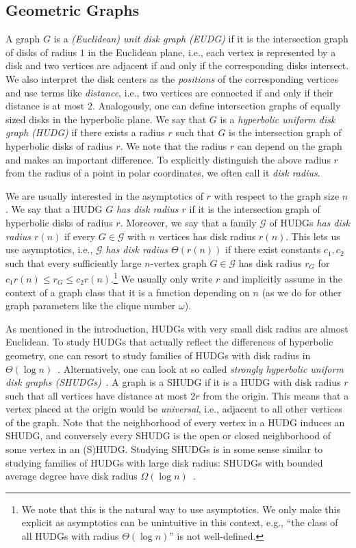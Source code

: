 \documentclass[a4paper,english,cleveref,thm-restate]{lipics-v2021}
\newcommand{\calG}{\ensuremath{\mathcal{G}}\xspace}
\begin{document}
\subsection{Geometric Graphs}

A graph $G$ is a \emph{(Euclidean) unit disk graph (EUDG)} if it is the intersection graph of disks of radius $1$ in the Euclidean plane, i.e., each vertex is represented by a disk and two vertices are adjacent if and only if the corresponding disks intersect.
We also interpret the disk centers as the \emph{positions} of the corresponding vertices and use terms like \emph{distance}, i.e., two vertices are connected if and only if their distance is at most $2$.
Analogously, one can define intersection graphs of equally sized disks in the hyperbolic plane.
We say that $G$ is a \emph{hyperbolic uniform disk graph (HUDG)} if there exists a radius $r$ such that $G$ is the intersection graph of hyperbolic disks of radius $r$.
We note that the radius $r$ can depend on the graph and makes an important difference.
To explicitly distinguish the above radius $r$ from the radius of a point in polar coordinates, we often call it \emph{disk radius}.

We are usually interested in the asymptotics of $r$ with respect to the graph size $n$.
We say that a HUDG $G$ \emph{has disk radius $r$} if it is the intersection graph of hyperbolic disks of radius $r$.
Moreover, we say that a family $\calG$ of HUDGs \emph{has disk radius $r(n)$} if every $G \in \calG$ with $n$ vertices has disk radius $r(n)$.
This lets us use asymptotics, i.e., $\calG$ \emph{has disk radius $\Theta(r(n))$} if there exist constants $c_1, c_2$ such that every sufficiently large $n$-vertex graph $G \in \calG$ has disk radius $r_G$ for $c_1 r(n) \le r_G \le c_2 r(n)$.\footnote{We note that this is the natural way to use asymptotics.
  We only make this explicit as asymptotics can be unintuitive in this context, e.g., \enquote{the class of all HUDGs with radius $\Theta(\log n)$} is not well-defined.}
We usually only write $r$ and implicitly assume in the context of a graph class that it is a function depending on $n$ (as we do for other graph parameters like the clique number $\omega$).

As mentioned in the introduction, HUDGs with very small disk radius are almost Euclidean.
To study HUDGs that actually reflect the differences of hyperbolic geometry, one can resort to study families of HUDGs with disk radius in $\Theta(\log n)$~\cite{Struc_Indep_Hyper_Unifor_Disk_Graph-Blaesius25}.
Alternatively, one can look at so called \emph{strongly hyperbolic uniform disk graphs (SHUDGs)}~\cite{blasius_strongly_2023}.
A graph is a SHUDG if it is a HUDG with disk radius $r$ such that all vertices have distance at most $2r$ from the origin.
This means that a vertex placed at the origin would be \emph{universal}, i.e., adjacent to all other vertices of the graph.
Note that the neighborhood of every vertex in a HUDG induces an SHUDG, and conversely every SHUDG is the open or closed neighborhood of some vertex in an (S)HUDG.
Studying SHUDGs is in some sense similar to studying families of HUDGs with large disk radius: SHUDGs with bounded average degree have disk radius $\Omega(\log n)$~\cite{blasius_strongly_2023}.
\end{document}
